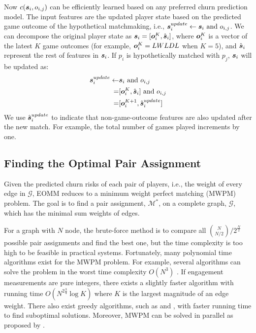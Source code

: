 Now $c(\boldsymbol{s}_i, o_{i,j})$ can be efficiently learned based on any preferred churn prediction model. The input features are the updated player state based on the predicted game outcome of the hypothetical matchmaking, i.e., $\boldsymbol{s}_i^{update} \leftarrow \boldsymbol{s}_i \text{ and } o_{i,j}$. We can decompose the original player state as $\boldsymbol{s}_i = [\boldsymbol{o}_i^K, \hat{\boldsymbol{s}}_i]$, where $\boldsymbol{o}_i^K$ is a vector of the latest $K$ game outcomes (for example, $\boldsymbol{o}_i^K=LWLDL$ when $K=5$), and $\hat{\boldsymbol{s}}_i$ represent the rest of features in $\boldsymbol{s}_i$. If $p_i$ is hypothetically matched with $p_j$, $\boldsymbol{s}_i$ will be updated as:
\begin{align}\label{eqn:stateUpdate}
\boldsymbol{s}_i^{update} \leftarrow& \boldsymbol{s}_i \text{ and } o_{i,j} \\
                    =& [\boldsymbol{o}_i^K, \hat{\boldsymbol{s}}_i] \text{ and } o_{i,j} \\
                    =& [\boldsymbol{o}_i^{K+1}, \hat{\boldsymbol{s}}_i^{update}]
\end{align}
We use $\hat{\boldsymbol{s}}_i^{update}$ to indicate that non-game-outcome features are also updated after the new match. For example, the total number of games played increments by one. 


\vspace{2mm}

\subsection{Finding the Optimal Pair Assignment}
Given the predicted churn risks of each pair of players, i.e., the weight of every edge in $\mathcal{G}$, EOMM reduces to a minimum weight perfect matching (MWPM) problem. The goal is to find a pair assignment, $\mathcal{M}^*$, on a complete graph, $\mathcal{G}$, which has the minimal sum weights of edges.

For a graph with $N$ node, the brute-force method is to compare all $\binom N{N/2} / 2^{\frac{N}{2}}$ possible pair assignments and find the best one, but the time complexity is too high to be feasible in practical systems. Fortunately, many polynomial time algorithms exist for the MWPM problem. For example, several algorithms can solve the problem in the worst time complexity $O(N^3)$ \citep{gabow1974implementation,lawler2001combinatorial}. If engagement measurements are pure integers, there exists a slightly faster algorithm \citep{gabow1985scaling} with running time $O(N^{2\frac{3}{4}}\log K)$ where $K$ is the largest magnitude of an edge weight. There also exist greedy algorithms, such as \textcite{drake2003simple} and \textcite{duan2014linear}, with faster running time to find suboptimal solutions. Moreover, MWPM can be solved in parallel as proposed by \citep{osiakwan1990maximum}.

